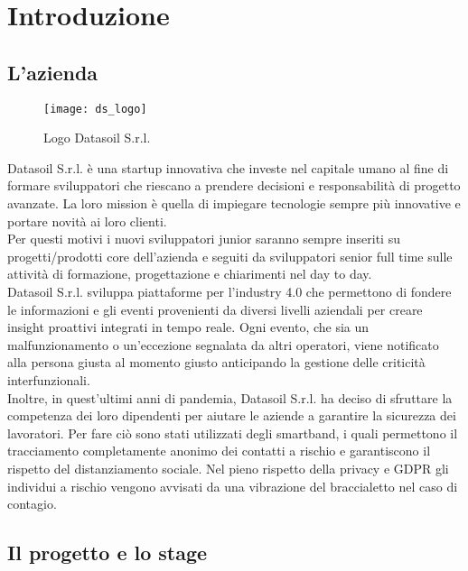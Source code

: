 
\chapter{Introduzione}
\label{cap:introduzione}

\section{L'azienda}
\begin{figure}[ht]
    \centering
    \texttt{[image: ds\_logo]}
    \caption{Logo Datasoil S.r.l.}
\end{figure}

Datasoil S.r.l. è una startup innovativa che investe nel capitale umano al fine di formare sviluppatori che riescano a prendere decisioni e responsabilità di progetto avanzate. La loro mission è quella di impiegare tecnologie sempre più innovative e portare novità ai loro clienti. \\Per questi motivi i nuovi sviluppatori junior saranno sempre inseriti su progetti/prodotti core dell’azienda e seguiti da sviluppatori senior full time sulle attività di formazione, progettazione e chiarimenti nel day to day.\\
Datasoil S.r.l. sviluppa piattaforme per l’industry 4.0 che permettono di fondere le informazioni e gli eventi provenienti da diversi livelli aziendali per creare insight proattivi integrati in tempo reale. Ogni evento, che sia un malfunzionamento o un'eccezione segnalata da altri operatori, viene notificato alla persona giusta al momento giusto anticipando la gestione delle criticità interfunzionali.\\
Inoltre, in quest'ultimi anni di pandemia, Datasoil S.r.l. ha deciso di sfruttare la competenza dei loro dipendenti per aiutare le aziende a garantire la sicurezza dei lavoratori. Per fare ciò sono stati utilizzati degli smartband, i quali permettono il tracciamento completamente anonimo dei contatti a rischio e garantiscono il rispetto del distanziamento sociale. Nel pieno rispetto della privacy e GDPR gli individui a rischio vengono avvisati da una vibrazione del braccialetto nel caso di contagio.

\section{Il progetto e lo stage}

